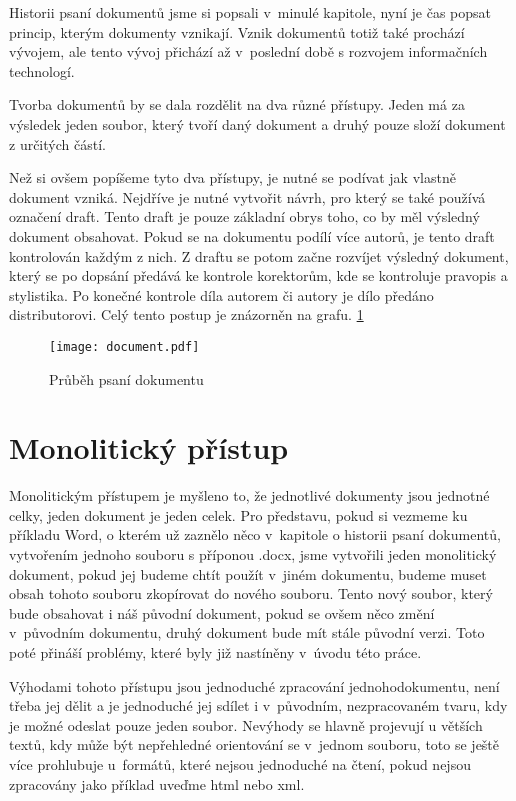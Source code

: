 Historii psaní dokumentů jsme si popsali v~minulé kapitole, nyní je čas popsat princip, kterým dokumenty vznikají. Vznik dokumentů totiž také prochází
vývojem, ale tento vývoj přichází až v~poslední době s rozvojem informačních technologí.

Tvorba dokumentů by se dala rozdělit na dva různé přístupy.
Jeden má za výsledek jeden soubor, který tvoří daný dokument a druhý pouze složí dokument z určitých částí.

Než si ovšem popíšeme tyto dva přístupy, je nutné se podívat jak vlastně dokument vzniká. Nejdříve je nutné vytvořit návrh, pro který se také používá
označení draft. Tento draft je pouze základní obrys toho, co by měl výsledný dokument obsahovat. Pokud se na dokumentu podílí více autorů, je
tento draft kontrolován každým z nich. Z draftu se potom začne rozvíjet výsledný dokument, který se po dopsání předává ke kontrole korektorům,
kde se \mbox{kontroluje} pravopis a stylistika. Po konečné kontrole díla autorem či autory je dílo předá\-no distributorovi. Celý tento postup
je znázorněn na grafu. \ref{fig:linflow}

\begin{figure}[h]
    \centering
    \texttt{[image: document.pdf]}
    \caption{Průběh psaní dokumentu}
    \label{fig:linflow}
\end{figure}

\section{Monolitický přístup}

Monolitickým přístupem je myšleno to, že jednotlivé dokumenty jsou jednotné celky, jeden dokument je jeden celek. Pro představu, pokud si vezmeme ku příkladu
Word, o kterém už zaznělo něco v~kapitole o historii psaní dokumentů, vytvořením jednoho souboru s příponou .docx, jsme vytvořili jeden monolitický dokument, pokud jej
budeme chtít použít v~jiném dokumentu, budeme muset obsah tohoto souboru zkopírovat do nového souboru. Tento nový soubor, který bude obsahovat i náš původní dokument,
pokud se ovšem něco změní v~původním dokumentu, druhý dokument bude mít stále původní verzi. Toto poté přináší problémy, které byly již nastíněny v~úvodu této práce.

Výhodami tohoto přístupu jsou jednoduché zpracování jednoho\linebreak dokumentu, není třeba jej dělit a je jednoduché jej sdílet i v~původním, nezpracovaném tvaru, kdy je
možné odeslat pouze jeden soubor. Nevýhody se hlavně projevují u větších textů, kdy může být nepřehledné orientování se v~jednom souboru, toto se ještě více
prohlubuje u~formátů, které nejsou jednoduché na čtení, pokud nejsou zpracovány jako příklad uveďme \gls{html} nebo \gls{xml}.

